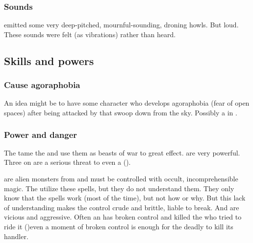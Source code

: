 \subsubsection{Sounds}
\Umbrae{} emitted some very deep-pitched, mournful-sounding, droning howls. 
But loud. 
These sounds were felt (as vibrations) rather than heard. 









\subsection{Skills and powers}





\subsubsection{Cause agoraphobia}
An idea might be to have some character who develops agoraphobia (fear of open spaces) after being attacked by  that swoop down from the sky. 
Possibly a \resphan{} in \Merkyrah. 






\subsubsection{Power and danger}
The \resphain{} tame the \umbrae{} and use them as beasts of war to great effect. 
\Umbrae{} are very powerful. 
Three \resphain{} on \umbrae{} are a serious threat to even a \dragon{} ().

\Umbrae{} are alien monsters from \Erebos{} and must be controlled with occult, incomprehensible \bane{} magic. 
The \resphain{} utilize these spells, but they do not understand them. 
They only know that the spells work (most of the time), but not how or why. 
But this lack of understanding makes the control crude and brittle, liable to break. 
And \umbrae{} are vicious and aggressive. 
Often an \umbra{} has broken control and killed the \resphan{} who tried to ride it ()\dash even a moment of broken control is enough for the deadly \umbra{} to kill its handler. 

